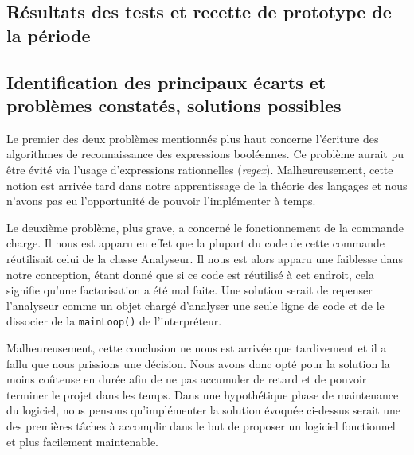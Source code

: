 \documentclass[12pt,a4paper,titlepage,openany, oneside]{report}
\begin{document}

    \subsection{Résultats des tests et recette de prototype de la période}


    \subsection{Identification des principaux écarts et problèmes constatés, solutions possibles}

    Le premier des deux problèmes mentionnés plus haut concerne l'écriture des
    algorithmes de reconnaissance des expressions booléennes. Ce problème aurait pu
    être évité via l'usage d'expressions rationnelles (\emph{regex}). Malheureusement,
    cette notion est arrivée tard dans notre apprentissage de la théorie des langages et
    nous n'avons pas eu l'opportunité de pouvoir l'implémenter à temps.

    Le deuxième problème, plus grave, a concerné le fonctionnement de la commande charge.
    Il nous est apparu en effet que la plupart du code de cette commande réutilisait celui
    de la classe Analyseur. Il nous est alors apparu une faiblesse dans notre conception,
    étant donné que si ce code est réutilisé à cet endroit, cela signifie qu'une
    factorisation a été mal faite. Une solution serait de repenser l'analyseur comme un
    objet chargé d'analyser une seule ligne de code et de le dissocier de la
    \verb|mainLoop()| de l'interpréteur.

    Malheureusement, cette conclusion ne nous est
    arrivée que tardivement et il a fallu que nous prissions une décision. Nous avons
    donc opté pour la solution la moins coûteuse en durée afin de ne pas accumuler de
    retard et de pouvoir terminer le projet dans les temps. Dans une hypothétique phase
    de maintenance du logiciel, nous pensons qu'implémenter la solution évoquée ci-dessus
    serait une des premières tâches à accomplir dans le but de proposer un logiciel
    fonctionnel et plus facilement maintenable.
\end{document}
